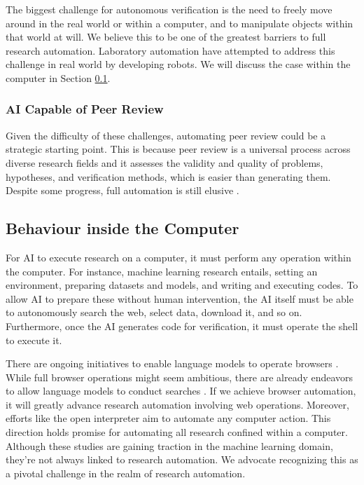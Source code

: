 The biggest challenge for autonomous verification is the need to freely move around in the real world or within a computer, and to manipulate objects within that world at will. We believe this to be one of the greatest barriers to full research automation. Laboratory automation have attempted to address this challenge in real world by developing robots. We will discuss the case within the computer in Section \ref{section:behaviour-inside-the-computer}.

\subsubsection{AI Capable of Peer Review}

Given the difficulty of these challenges, automating peer review could be a strategic starting point. This is because peer review is a universal process across diverse research fields and it assesses the validity and quality of problems, hypotheses, and verification methods, which is easier than generating them. Despite some progress, full automation is still elusive \cite{yuan2022can,schulz2022future}.


\subsection{Behaviour inside the Computer}
\label{section:behaviour-inside-the-computer}
For AI to execute research on a computer, it must perform any operation within the computer. For instance, machine learning research entails, setting an environment, preparing datasets and models, and writing and executing codes. To allow AI to prepare these without human intervention, the AI itself must be able to autonomously search the web, select data, download it, and so on. Furthermore, once the AI generates code for verification, it must operate the shell to execute it.

There are ongoing initiatives to enable language models to operate browsers \cite{nakano2021webgpt,act1}. While full browser operations might seem ambitious, there are already endeavors to allow language models to conduct searches \cite{mialon2023augmented}. If we achieve browser automation, it will greatly advance research automation involving web operations. Moreover, efforts like the open interpreter \cite{openinterpreter} aim to automate any computer action. This direction holds promise for automating all research confined within a computer. Although these studies are gaining traction in the machine learning domain, they're not always linked to research automation. We advocate recognizing this as a pivotal challenge in the realm of research automation.

